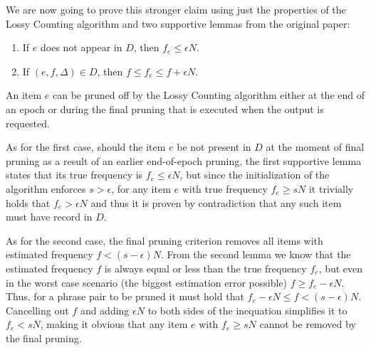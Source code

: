We are now going to prove this stronger claim using just the properties of the Lossy Counting
algorithm and two supportive lemmas from the original paper:
\begin{enumerate}
  \item If $e$ does not appear in $D$, then $f_{e} \leq \epsilon N$.
  \item If $(e,f,\Delta) \in D$, then $f \leq f_{e} \leq f + \epsilon N$.
\end{enumerate}

An item $e$ can be pruned off by the Lossy Counting algorithm either at the end of an epoch or
during the final pruning that is executed when the output is requested.

As for the first case, should the item $e$ be not present in $D$ at the moment of final
pruning as a result of an earlier end-of-epoch pruning, the first supportive lemma states
that its true frequency is $f_e \leq \epsilon N$, but since the initialization of the algorithm
enforces $s > \epsilon$, for any item $e$ with true frequency $f_{e} \geq sN$ it trivially
holds that $f_{e} > \epsilon N$ and thus it is proven by contradiction that any such item
must have record in $D$.

As for the second case, the final pruning criterion removes all items with estimated frequency
$f < (s - \epsilon)N$. From the second lemma we know that the estimated frequency $f$ is always
equal or less than the true frequency $f_{e}$, but even in the worst case scenario (the biggest
estimation error possible) $f \geq f_{e} - \epsilon N$.
Thus, for a phrase pair to be pruned it must hold that $f_{e} - \epsilon N \leq f < (s - \epsilon) N$.
Cancelling out $f$ and adding $\epsilon N$ to both sides of the inequation simplifies it to $f_{e} < sN$,
making it obvious that any item $e$ with $f_{e} \geq sN$ cannot be removed by the final pruning.

